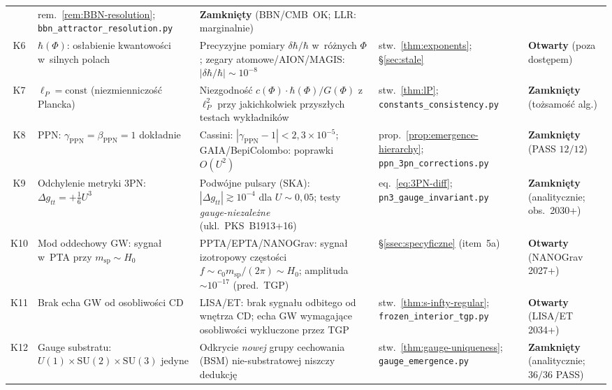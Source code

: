 \begin{center}
\begin{tabular}{@{}c>{\raggedright}p{3.1cm}p{4.4cm}p{2.0cm}p{2.0cm}@{}}
   & rem.~\ref{rem:BBN-resolution}; \texttt{bbn\_attractor\_resolution.py}
   & \textbf{Zamkni\k{e}ty} (BBN/CMB~OK; LLR: marginalnie) \\[3pt]
K6 & $\hbar(\Phi)$: os\l{}abienie kwantowo\'sci w~silnych polach
   & Precyzyjne pomiary $\delta\hbar/\hbar$ w~r\'o\.znych $\Phi$;
     zegary atomowe/AION/MAGIS: $|\delta\hbar/\hbar| \sim 10^{-8}$
   & stw.~\ref{thm:exponents}; \S\ref{sec:stale}
   & \textbf{Otwarty} (poza dost\k{e}pem) \\[3pt]
K7 & $\ell_P = \mathrm{const}$ (niezmienniczo\'s\'c Plancka)
   & Niezgodno\'s\'c $c(\Phi)\cdot\hbar(\Phi)/G(\Phi)$ z~$\ell_P^2$
     przy jakichkolwiek przysz\l{}ych testach wyk\l{}adnik\'ow
   & stw.~\ref{thm:lP}; \texttt{constants\_consistency.py}
   & \textbf{Zamkni\k{e}ty} (to\.zsamo\'s\'c alg.) \\[3pt]
K8 & PPN: $\gamma_{\mathrm{PPN}} = \beta_{\mathrm{PPN}} = 1$ dok\l{}adnie~\cite{Will2014}
   & Cassini: $|\gamma_{\mathrm{PPN}} - 1| < 2{,}3\times10^{-5}$;
     GAIA/BepiColombo: poprawki $O(U^2)$
   & prop.~\ref{prop:emergence-hierarchy}; \texttt{ppn\_3pn\_corrections.py}
   & \textbf{Zamkni\k{e}ty} (PASS $12/12$) \\[3pt]
K9 & Odchylenie metryki 3PN: $\Delta g_{tt} = +\tfrac{1}{6}U^3$
   & Podw\'ojne pulsary (SKA): $|\Delta g_{tt}| \gtrsim 10^{-4}$
     dla $U \sim 0{,}05$;
     testy \emph{gauge-niezale\.zne} (ukl.~PKS~B1913+16)
   & eq.~\eqref{eq:3PN-diff}; \texttt{pn3\_gauge\_invariant.py}
   & \textbf{Zamkni\k{e}ty} (analitycznie; obs.\ 2030+) \\[3pt]
K10 & Mod oddechowy GW: sygna\l{} w~PTA przy $m_{\mathrm{sp}} \sim H_0$
   & PPTA/EPTA/NANOGrav: sygna\l{} izotropowy cz\k{e}sto\'sci
     $f \sim c_0 m_{\mathrm{sp}}/(2\pi) \sim H_0$;
     amplituda $\sim 10^{-17}$ (pred.~TGP)
   & \S\ref{ssec:specyficzne} (item~5a)
   & \textbf{Otwarty} (NANOGrav 2027+) \\[3pt]
K11 & Brak echa GW od osobliwo\'sci CD
   & LISA/ET: brak sygna\l{}u odbitego od wn\k{e}trza CD;
     echa GW wymagaj\k{a}ce osobliwo\'sci wykluczone przez TGP
   & stw.~\ref{thm:s-infty-regular}; \texttt{frozen\_interior\_tgp.py}
   & \textbf{Otwarty} (LISA/ET 2034+) \\[3pt]
K12 & Gauge substratu: $U(1)\times\mathrm{SU}(2)\times\mathrm{SU}(3)$ jedyne
   & Odkrycie \emph{nowej} grupy cechowania (BSM)
     nie-substratowej niszczy dedukcj\k{e}
   & stw.~\ref{thm:gauge-uniqueness}; \texttt{gauge\_emergence.py}
   & \textbf{Zamkni\k{e}ty} (analitycznie; $36/36$ PASS) \\[3pt]

\end{tabular}
\end{center}

